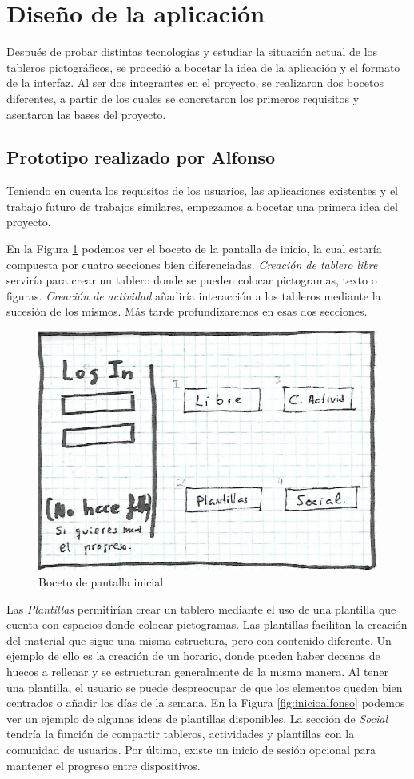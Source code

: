 \section{Diseño de la aplicación}
\label{cap4:diseñoapp}
Después de probar distintas tecnologías y estudiar la situación actual de los tableros pictográficos, se procedió a bocetar la idea de la aplicación y el formato de la interfaz. Al ser dos integrantes en el proyecto, se realizaron dos bocetos diferentes, a partir de los cuales se concretaron los primeros requisitos y asentaron las bases del proyecto.


\subsection{Prototipo realizado por Alfonso}
\label{cap4:sec:alfonso}
Teniendo en cuenta los requisitos de los usuarios, las aplicaciones existentes y el trabajo futuro de trabajos similares, empezamos a bocetar una primera idea del proyecto.


En la Figura \ref{fig:loginalfonso} podemos ver el boceto de la pantalla de  inicio, la cual estaría compuesta por cuatro secciones bien diferenciadas. \textit{Creación de tablero libre} serviría para crear un tablero donde se pueden colocar pictogramas, texto o figuras. \textit{Creación de actividad} añadiría interacción a los tableros mediante la sucesión de los mismos. Más tarde profundizaremos en esas dos secciones.

\begin{figure}[h!]
	\centering
	\includegraphics[width=0.7\linewidth]{Imagenes/Bitmap/logInAlfonso}
	\caption{Boceto de pantalla inicial}
	\label{fig:loginalfonso}
\end{figure}

Las \textit{Plantillas} permitirían crear un tablero mediante el uso de una plantilla que cuenta con espacios donde colocar pictogramas. Las plantillas facilitan la creación del material que sigue una misma estructura, pero con contenido diferente. Un ejemplo de ello es la creación de un horario, donde pueden haber decenas de huecos a rellenar y se estructuran generalmente de la misma manera. Al tener una plantilla, el usuario se puede despreocupar de que los elementos queden bien centrados o añadir los días de la semana. En la Figura \ref{fig:inicioalfonso} podemos ver un ejemplo de algunas ideas de plantillas disponibles. 
La sección de \textit{Social} tendría la función de compartir tableros, actividades y plantillas con la comunidad de usuarios. Por último, existe un inicio de sesión opcional para mantener el progreso entre dispositivos.

